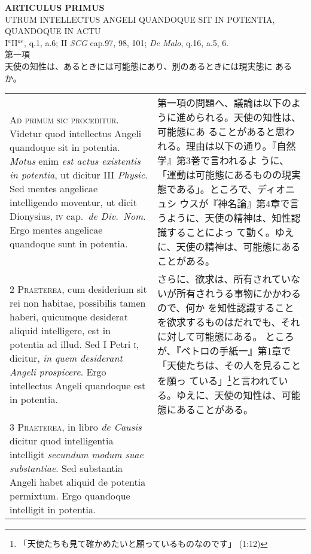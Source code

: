 \documentclass[10pt]{jsarticle} %
\begin{document}
\newpage

\begin{center}
 {\Large {\bf ARTICULUS PRIMUS}}\\
 {\large UTRUM INTELLECTUS ANGELI QUANDOQUE SIT IN POTENTIA, QUANDOQUE
 IN ACTU}\\
 {\footnotesize I$^a$II$^{ae}$, q.1, a.6; II {\itshape SCG} cap.97, 98,
 101; {\itshape De Malo}, q.16, a.5, 6.}\\
 {\Large 第一項\\天使の知性は、あるときには可能態にあり、別のあるときには現実態に
	あるか。}
\end{center}

\begin{longtable}{p{21em}p{21em}}

{\Huge A}{\scshape d primum sic proceditur}. Videtur quod
intellectus Angeli quandoque sit in potentia. {\itshape Motus} enim {\itshape est actus
existentis in potentia}, ut dicitur III {\itshape Physic}. Sed mentes angelicae
intelligendo moventur, ut dicit Dionysius, {\scshape iv} cap.~{\itshape de Div.~Nom}. Ergo
mentes angelicae quandoque sunt in potentia.


&

第一項の問題へ、議論は以下のように進められる。天使の知性は、可能態にあ
ることがあると思われる。理由は以下の通り。『自然学』第3巻で言われるよ
うに、「運動は可能態にあるものの現実態である」。ところで、ディオニュシ
ウスが『神名論』第4章で言うように、天使の精神は、知性認識することによっ
て動く。ゆえに、天使の精神は、可能態にあることがある。

\\


{\scshape 2 Praeterea}, cum desiderium sit rei non
habitae, possibilis tamen haberi, quicumque desiderat aliquid
intelligere, est in potentia ad illud. Sed I Petri {\scshape i}, dicitur, {\itshape in quem
desiderant Angeli prospicere}. Ergo intellectus Angeli quandoque est in
potentia.


&

さらに、欲求は、所有されていないが所有されうる事物にかかわるので、何か
を知性認識することを欲求するものはだれでも、それに対して可能態にある。
ところが、『ペトロの手紙一』第1章で「天使たちは、その人を見ることを願っ
ている」\footnote{「天使たちも見て確かめたいと願っているものなのです」
(1:12)}と言われている。ゆえに、天使の知性は、可能態にあることがある。

\\


{\scshape 3 Praeterea}, in libro {\itshape de Causis} dicitur quod
intelligentia intelligit {\itshape secundum modum suae substantiae}. Sed substantia
Angeli habet aliquid de potentia permixtum. Ergo quandoque intelligit in
potentia.



\end{longtable}
\end{document}
